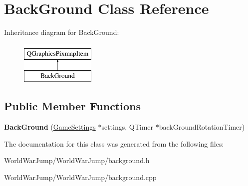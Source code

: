 \hypertarget{class_back_ground}{}\section{Back\+Ground Class Reference}
\label{class_back_ground}
Inheritance diagram for Back\+Ground\+:\begin{figure}[H]
\begin{center}
\leavevmode
\includegraphics[height=2.000000cm]{class_back_ground}
\end{center}
\end{figure}
\subsection*{Public Member Functions}
\begin{DoxyCompactItemize}
\item 
{\bfseries Back\+Ground} (\hyperlink{class_game_settings}{Game\+Settings} $\ast$settings, Q\+Timer $\ast$back\+Ground\+Rotation\+Timer)\hypertarget{class_back_ground_a30f171b979fa95cff7e4beea65da174e}{}\label{class_back_ground_a30f171b979fa95cff7e4beea65da174e}

\end{DoxyCompactItemize}


The documentation for this class was generated from the following files\+:\begin{DoxyCompactItemize}
\item 
World\+War\+Jump/\+World\+War\+Jump/background.\+h\item 
World\+War\+Jump/\+World\+War\+Jump/background.\+cpp\end{DoxyCompactItemize}
